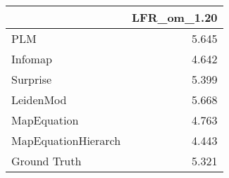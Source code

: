 \begin{tabular}{lr}
\toprule
{} & LFR_om_1.20 \\
\midrule
PLM                 &       5.645 \\
Infomap             &       4.642 \\
Surprise            &       5.399 \\
LeidenMod           &       5.668 \\
MapEquation         &       4.763 \\
MapEquationHierarch &       4.443 \\
Ground Truth        &       5.321 \\
\bottomrule
\end{tabular}

